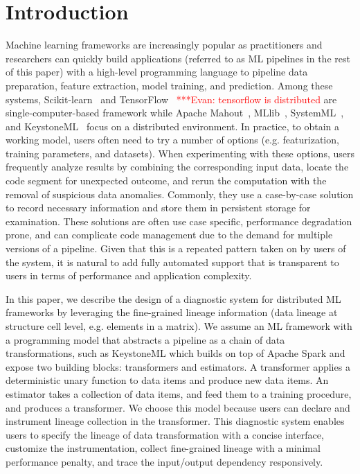 \documentclass{sig-alternate}
\newcommand{\evannote}[1]{{\textcolor{red}    { ***Evan:      #1 }}}
\newcommand{\evannote}[1]{}
\begin{document}
\section{Introduction}
Machine learning frameworks are increasingly popular as practitioners and researchers can quickly
build applications (referred to as ML pipelines in the rest of this paper) with a high-level 
programming language to pipeline data preparation, feature extraction, model training, 
and prediction. 
Among these systems, Scikit-learn~\cite{pedregosa2011scikit} and TensorFlow~\cite{tensorflow15} \evannote{tensorflow is distributed}
are single-computer-based framework while Apache Mahout~\cite{owen2011mahout}, MLlib~\cite{meng2015mllib}, 
SystemML~\cite{ghoting11systemml}, and KeystoneML~\cite{sparks15} focus on a distributed environment.
In practice, to obtain a working model, users often need to try a number of options (e.g. featurization, training parameters, and datasets). 
When experimenting with these options, users frequently analyze results by combining the corresponding input data,  
locate the code segment for unexpected outcome, and rerun the computation with the removal of suspicious data anomalies.
Commonly, they use a case-by-case solution to record necessary information and store them in persistent storage for examination.
These solutions are often use case specific, performance degradation prone, and can complicate code
management due to the demand for multiple versions of a pipeline.
Given that this is a repeated pattern taken on by users of the system, it is natural to add fully automated support 
that is transparent to users in terms of performance and application complexity.

In this paper, we describe the design of a diagnostic system for distributed ML frameworks by leveraging the fine-grained lineage information
(data lineage at structure cell level, e.g. elements in a matrix). 
We assume an ML framework with a programming model that abstracts a pipeline as a chain of data transformations, such as KeystoneML
which builds on top of Apache Spark and expose two building blocks: transformers and estimators.
A transformer applies a deterministic unary function to data items and produce new data items.
An estimator takes a collection of data items, and feed them to a training procedure,  and produces a transformer.
We choose this model because users can declare and instrument lineage collection in the transformer.
This diagnostic system enables users to specify the lineage of data transformation with a concise interface, customize the instrumentation, 
collect fine-grained lineage with a minimal performance penalty, and trace the input/output dependency responsively. 
\end{document}
